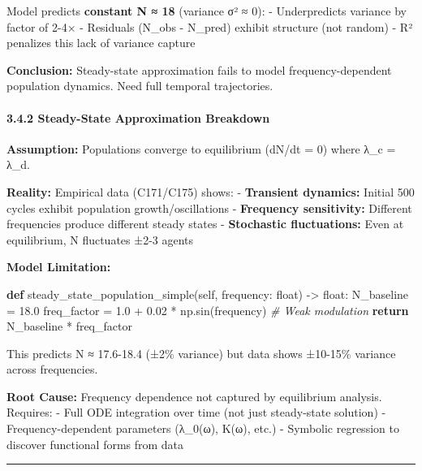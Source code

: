 \documentclass[
]{article}
\newenvironment{Shaded}{}{}
\newcommand{\BuiltInTok}[1]{\textcolor[rgb]{0.00,0.50,0.00}{#1}}
\newcommand{\CommentTok}[1]{\textcolor[rgb]{0.38,0.63,0.69}{\textit{#1}}}
\newcommand{\ControlFlowTok}[1]{\textcolor[rgb]{0.00,0.44,0.13}{\textbf{#1}}}
\newcommand{\FloatTok}[1]{\textcolor[rgb]{0.25,0.63,0.44}{#1}}
\newcommand{\KeywordTok}[1]{\textcolor[rgb]{0.00,0.44,0.13}{\textbf{#1}}}
\newcommand{\NormalTok}[1]{#1}
\newcommand{\OperatorTok}[1]{\textcolor[rgb]{0.40,0.40,0.40}{#1}}
\newcommand{\VariableTok}[1]{\textcolor[rgb]{0.10,0.09,0.49}{#1}}
\begin{document}
Model predicts \textbf{constant N ≈ 18} (variance σ² ≈ 0): -
Underpredicts variance by factor of 2-4× - Residuals (N\_obs - N\_pred)
exhibit structure (not random) - R² penalizes this lack of variance
capture

\textbf{Conclusion:} Steady-state approximation fails to model
frequency-dependent population dynamics. Need full temporal
trajectories.

\paragraph{3.4.2 Steady-State Approximation
Breakdown}\label{steady-state-approximation-breakdown}

\textbf{Assumption:} Populations converge to equilibrium (dN/dt = 0)
where λ\_c = λ\_d.

\textbf{Reality:} Empirical data (C171/C175) shows: - \textbf{Transient
dynamics:} Initial 500 cycles exhibit population growth/oscillations -
\textbf{Frequency sensitivity:} Different frequencies produce different
steady states - \textbf{Stochastic fluctuations:} Even at equilibrium, N
fluctuates ±2-3 agents

\textbf{Model Limitation:}

\begin{Shaded}
\begin{Highlighting}[]
\KeywordTok{def}\NormalTok{ steady\_state\_population\_simple(}\VariableTok{self}\NormalTok{, frequency: }\BuiltInTok{float}\NormalTok{) }\OperatorTok{{-}\textgreater{}} \BuiltInTok{float}\NormalTok{:}
\NormalTok{    N\_baseline }\OperatorTok{=} \FloatTok{18.0}
\NormalTok{    freq\_factor }\OperatorTok{=} \FloatTok{1.0} \OperatorTok{+} \FloatTok{0.02} \OperatorTok{*}\NormalTok{ np.sin(frequency)  }\CommentTok{\# Weak modulation}
    \ControlFlowTok{return}\NormalTok{ N\_baseline }\OperatorTok{*}\NormalTok{ freq\_factor}
\end{Highlighting}
\end{Shaded}

This predicts N ≈ 17.6-18.4 (±2\% variance) but data shows ±10-15\%
variance across frequencies.

\textbf{Root Cause:} Frequency dependence not captured by equilibrium
analysis. Requires: - Full ODE integration over time (not just
steady-state solution) - Frequency-dependent parameters (λ\_0(ω), K(ω),
etc.) - Symbolic regression to discover functional forms from data

\begin{center}\rule{0.5\linewidth}{0.5pt}\end{center}
\end{document}
